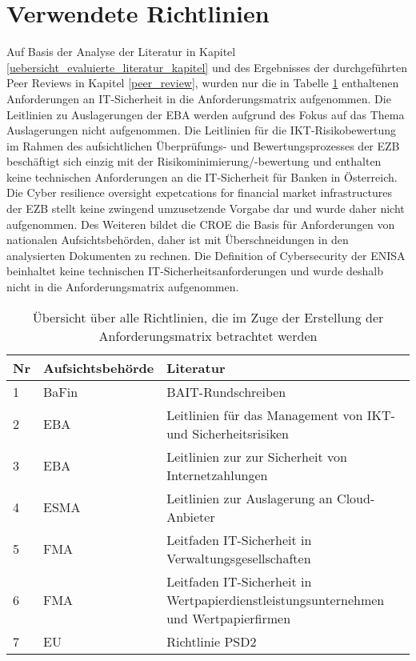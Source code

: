 
\section{Verwendete Richtlinien}\label{Übersicht_Literatur}
Auf Basis der Analyse der Literatur in Kapitel \ref{uebersicht_evaluierte_literatur_kapitel} und des Ergebnisses der durchgeführten Peer Reviews in Kapitel \ref{peer_review}, wurden nur die in Tabelle \ref{table:uebersicht_verwendete_literatur} enthaltenen Anforderungen an IT-Sicherheit in die Anforderungsmatrix aufgenommen.
Die \glqq{}Leitlinien zu Auslagerungen\grqq{} der EBA werden aufgrund des Fokus auf das Thema Auslagerungen nicht aufgenommen. Die \glqq{}Leitlinien für die IKT-Risikobewertung im Rahmen des aufsichtlichen Überprüfungs- und Bewertungsprozesses\grqq{} der EZB beschäftigt sich einzig mit der Risikominimierung/-bewertung und enthalten keine technischen Anforderungen an die IT-Sicherheit für Banken in Österreich. Die \glqq{}Cyber resilience oversight expetcations for financial market infrastructures\grqq{} der EZB stellt keine zwingend umzusetzende Vorgabe dar und wurde daher nicht aufgenommen. Des Weiteren bildet die CROE die Basis für Anforderungen von nationalen Aufsichtsbehörden, daher ist mit Überschneidungen in den analysierten Dokumenten zu rechnen. Die \glqq{}Definition of Cybersecurity\grqq{} der ENISA beinhaltet keine technischen IT-Sicherheitsanforderungen und wurde deshalb nicht in die Anforderungsmatrix aufgenommen.
\bigbreak
\begin{table}[H]
    \centering
    \tiny
    \caption{Übersicht über alle Richtlinien, die im Zuge der Erstellung der Anforderungsmatrix betrachtet werden} 
        \begin{tabular}{lll}
            \hline
            Nr & Aufsichtsbehörde & Literatur\\
            \hline\hline
            1 & BaFin & BAIT-Rundschreiben \autocite{bafin_rundschreiben}\\
            2 & EBA & Leitlinien für das Management von IKT- und Sicherheitsrisiken \autocite{eba_final_draft}\\
            3 & EBA & Leitlinien zur zur Sicherheit von Internetzahlungen \autocite{eba_internet_security}\\
            4 & ESMA & Leitlinien zur Auslagerung an Cloud-Anbieter \autocite{ESMA_Cloud}\\
            5 & FMA & Leitfaden IT-Sicherheit in Verwaltungsgesellschaften \autocite{FMA_Leitfaden_IT_Sicherheit}\\
            6 & FMA & Leitfaden IT-Sicherheit in Wertpapierdienstleistungsunternehmen und Wertpapierfirmen \autocite{FMA_Leitfaden_IT_Sicherheit_Wertpapier}\\
            7 & EU & Richtlinie PSD2 \autocite{EU_PSD2}\\
        \end{tabular}
        \label{table:uebersicht_verwendete_literatur}
\end{table}